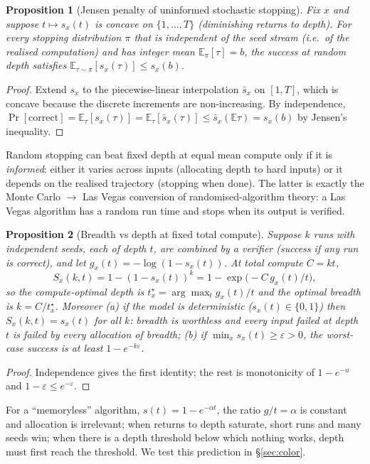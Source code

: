 \documentclass[10pt]{article}
\newtheorem{proposition}{Proposition}
\theoremstyle{definition}
\theoremstyle{remark}
\newcommand{\E}{\mathbb{E}}
\begin{document}
\begin{proposition}[Jensen penalty of uninformed stochastic stopping]\label{prop:jensen}
Fix $x$ and suppose $t\mapsto s_x(t)$ is concave on $\{1,\dots,T\}$ (diminishing returns to depth).  For every
stopping distribution $\pi$ that is independent of the seed stream (i.e.\ of the realised computation) and has
integer mean $\E_\pi[\tau]=b$, the success at random depth satisfies $\E_{\tau\sim\pi}[s_x(\tau)]\le s_x(b)$.
\end{proposition}
\begin{proof}
Extend $s_x$ to the piecewise-linear interpolation $\bar s_x$ on $[1,T]$, which is concave because the discrete
increments are non-increasing.  By independence, $\Pr[\text{correct}]=\E_\tau[s_x(\tau)]=\E_\tau[\bar s_x(\tau)]\le
\bar s_x(\E\tau)=s_x(b)$ by Jensen's inequality.
\end{proof}
Random stopping can beat fixed depth at equal mean compute only if it is \emph{informed}: either it varies across
inputs (allocating depth to hard inputs) or it depends on the realised trajectory (stopping when done).  The
latter is exactly the Monte Carlo $\to$ Las Vegas conversion of randomised-algorithm theory: a Las Vegas algorithm
has a random run time and stops when its output is verified.

\begin{proposition}[Breadth vs depth at fixed total compute]\label{prop:breadth}
Suppose $k$ runs with independent seeds, each of depth $t$, are combined by a verifier (success if any run is
correct), and let $g_x(t)=-\log(1-s_x(t))$.  At total compute $C=kt$,
\[
S_x(k,t)=1-(1-s_x(t))^k=1-\exp\!\big(-C\,g_x(t)/t\big),
\]
so the compute-optimal depth is $t^\star_x=\arg\max_t g_x(t)/t$ and the optimal breadth is $k=C/t^\star_x$.
Moreover (a) if the model is deterministic ($s_x(t)\in\{0,1\}$) then $S_x(k,t)=s_x(t)$ for all $k$: breadth is
worthless and every input failed at depth $t$ is failed by every allocation of breadth; (b) if
$\min_x s_x(t)\ge\varepsilon>0$, the worst-case success is at least $1-e^{-k\varepsilon}$.
\end{proposition}
\begin{proof}Independence gives the first identity; the rest is monotonicity of $1-e^{-u}$ and $1-\varepsilon\le e^{-\varepsilon}$.\end{proof}
For a ``memoryless'' algorithm, $s(t)=1-e^{-\alpha t}$, the ratio $g/t=\alpha$ is constant and allocation is
irrelevant; when returns to depth saturate, short runs and many seeds win; when there is a depth threshold below
which nothing works, depth must first reach the threshold.  We test this prediction in \S\ref{sec:color}.
\end{document}
